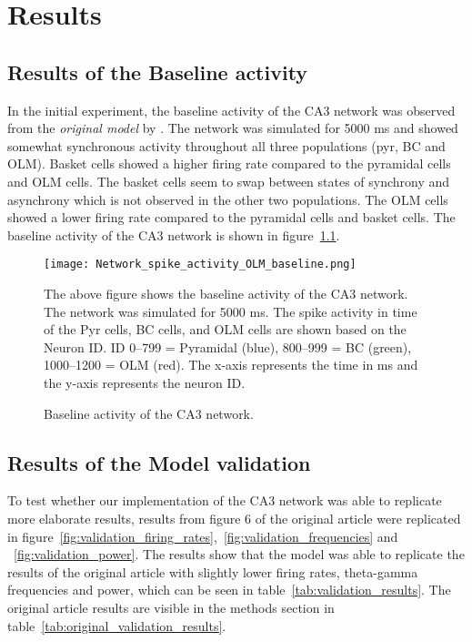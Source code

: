 \chapter{Results}


\section{Results of the Baseline activity}
In the initial experiment, the baseline activity of the CA3 network was
observed from the \textit{original model} by
\textcite{sanjayImpairedDendriticInhibition2015}. The network was simulated for
5000 ms and showed somewhat synchronous activity throughout all three
populations (pyr, BC and OLM). Basket cells showed a higher firing rate
compared to the pyramidal cells and OLM cells. The basket cells seem to swap
between states of synchrony and asynchrony which is not observed in the other
two populations. The OLM cells showed a lower firing rate compared to the
pyramidal cells and basket cells. The baseline activity of the CA3 network is
shown in figure~\ref{fig:baseline_activity}.

\begin{figure}[htbp]
    \centering
    \texttt{[image: Network\_spike\_activity\_OLM\_baseline.png]}
    \caption[Baseline activity of the CA3 network]{Baseline activity of the CA3 network.}\label{fig:baseline_activity}
    \begin{minipage}{0.9\textwidth}
        The above figure shows the baseline activity of the CA3 network. The network was simulated for 5000 ms. The spike activity in time of the Pyr cells, BC cells, and OLM cells are shown based on the Neuron ID\@. ID 0--799 = Pyramidal (blue), 800--999 = BC (green), 1000--1200 = OLM (red). The x-axis represents the time in ms and the y-axis represents the neuron ID\@.
    \end{minipage}
\end{figure}

\section{Results of the Model validation}
To test whether our implementation of the CA3 network was able to replicate
more elaborate results, results from figure 6 of the original
\textcite{sanjayImpairedDendriticInhibition2015} article were replicated in
figure~\ref{fig:validation_firing_rates},~\ref{fig:validation_frequencies} and
~\ref{fig:validation_power}. The results show that the model was able to
replicate the results of the original article with slightly lower firing rates,
theta-gamma frequencies and power, which can be seen in
table~\ref{tab:validation_results}. The original article results are visible in
the methods section in table~\ref{tab:original_validation_results}.

